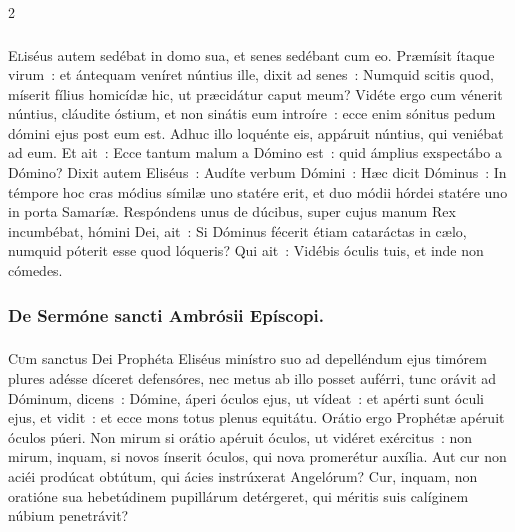 \documentclass[9pt,twoside]{extarticle}
\begin{document}
\begin{multicols}{2}
\begin{tightlist}{}
\item {} 
\end{tightlist}

\subsubsection*{\center {}}
\lettrine{E}liséus autem sedébat in domo sua, et senes sedébant cum eo. Præmísit ítaque virum~: et ántequam veníret núntius ille, dixit ad senes~: Numquid scitis quod, míserit fílius homicídæ hic, ut præcidátur caput meum? Vidéte ergo cum vénerit núntius, cláudite óstium, et non sinátis eum introíre~: ecce enim sónitus pedum dómini ejus post eum est.
Adhuc illo loquénte eis, appáruit núntius, qui veniébat ad eum. Et ait~: Ecce tantum malum a Dómino est~: quid ámplius exspectábo a Dómino?
Dixit autem Eliséus~: Audíte verbum Dómini~: Hæc dicit Dóminus~: In témpore hoc cras módius símilæ uno statére erit, et duo módii hórdei statére uno in porta Samaríæ.
Respóndens unus de dúcibus, super cujus manum Rex incumbébat, hómini Dei, ait~: Si Dóminus fécerit étiam cataráctas in cælo, numquid póterit esse quod lóqueris? Qui ait~: Vidébis óculis tuis, et inde non cómedes.

\subsubsection*{\center De Sermóne sancti Ambrósii Epíscopi.}
\subsubsection*{\center {}}
\lettrine{C}um sanctus Dei Prophéta Eliséus minístro suo ad depelléndum ejus timórem plures adésse díceret defensóres, nec metus ab illo posset auférri, tunc orávit ad Dóminum, dicens~: Dómine, áperi óculos ejus, ut vídeat~: et apérti sunt óculi ejus, et vidit~: et ecce mons totus plenus equitátu. Orátio ergo Prophétæ apéruit óculos púeri. Non mirum si orátio apéruit óculos, ut vidéret exércitus~: non mirum, inquam, si novos ínserit óculos, qui nova promerétur auxília. Aut cur non aciéi prodúcat obtútum, qui ácies instrúxerat Angelórum? Cur, inquam, non oratióne sua hebetúdinem pupillárum detérgeret, qui méritis suis calíginem núbium penetrávit?

\begin{tightlist}{}
\item {}
\end{tightlist}


\end{multicols}
\end{document}
